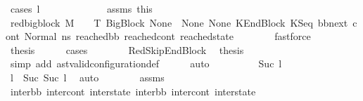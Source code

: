 \begin{isabellebody}
\ {\isacharparenleft}{\kern0pt}cases\ l{}{\isacharparenright}{\kern0pt}\isanewline
\ \ \ \ \isamarkupfalse%
\ {}\isanewline
\ \ \ \ \isamarkupfalse%
\ {}\ assms\ this\ \isamarkupfalse%
\ {\isachardoublequoteopen}{\isacharparenleft}{\kern0pt}red{\isacharunderscore}{\kern0pt}bigblock\ M\ {\isasymLambda}\ {\isasymGamma}\ {\isasymOmega}\ T\ {\isacharparenleft}{\kern0pt}BigBlock\ None\ {\isacharbrackleft}{\kern0pt}{\isacharbrackright}{\kern0pt}\ None\ None{\isacharcomma}{\kern0pt}\ KEndBlock\ {\isacharparenleft}{\kern0pt}KSeq\ bb{\isacharunderscore}{\kern0pt}next\ cont{}{\isacharparenright}{\kern0pt}{\isacharcomma}{\kern0pt}\ Normal\ ns{}{\isacharparenright}{\kern0pt}\ {\isacharparenleft}{\kern0pt}reached{\isacharunderscore}{\kern0pt}bb{\isacharcomma}{\kern0pt}\ reached{\isacharunderscore}{\kern0pt}cont{\isacharcomma}{\kern0pt}\ reached{\isacharunderscore}{\kern0pt}state{\isacharparenright}{\kern0pt}{\isacharparenright}{\kern0pt}{\isachardoublequoteclose}\isanewline
\ \ \ \ \ \ \isamarkupfalse%
\ fastforce\isanewline
\ \ \ \ \isamarkupfalse%
\ \isamarkupfalse%
\ {\isacharquery}{\kern0pt}thesis\isanewline
\ \ \ \ \isamarkupfalse%
\ cases\isanewline
\ \ \ \ \ \ \isamarkupfalse%
\ RedSkipEndBlock\ \isamarkupfalse%
\ {\isacharquery}{\kern0pt}thesis\ \isamarkupfalse%
\ {\isacharparenleft}{\kern0pt}simp\ add{\isacharcolon}{\kern0pt}\ ast{\isacharunderscore}{\kern0pt}valid{\isacharunderscore}{\kern0pt}configuration{\isacharunderscore}{\kern0pt}def{\isacharparenright}{\kern0pt}\isanewline
\ \ \ \ \isamarkupfalse%
\ auto\isanewline
\ \ \isamarkupfalse%
\isanewline
\ \ \ \ \isamarkupfalse%
\ {}{\isacharcolon}{\kern0pt}\ {\isacharparenleft}{\kern0pt}Suc\ l{}{\isacharparenright}{\kern0pt}\isanewline
\ \ \ \ \isamarkupfalse%
\ {}\ {}\ \isamarkupfalse%
\ {\isachardoublequoteopen}l\ {\isacharequal}{\kern0pt}\ Suc\ {\isacharparenleft}{\kern0pt}Suc\ l{}{\isacharparenright}{\kern0pt}{\isachardoublequoteclose}\ \isamarkupfalse%
\ auto\isanewline
\ \ \ \ \isamarkupfalse%
\ {}\ {}\ assms\ \isamarkupfalse%
\ inter{\isacharunderscore}{\kern0pt}bb\ inter{\isacharunderscore}{\kern0pt}cont\ inter{\isacharunderscore}{\kern0pt}state\ inter{\isacharunderscore}{\kern0pt}bb{}\ inter{\isacharunderscore}{\kern0pt}cont{}\ inter{\isacharunderscore}{\kern0pt}state{}\ \isanewline

\end{isabellebody}
